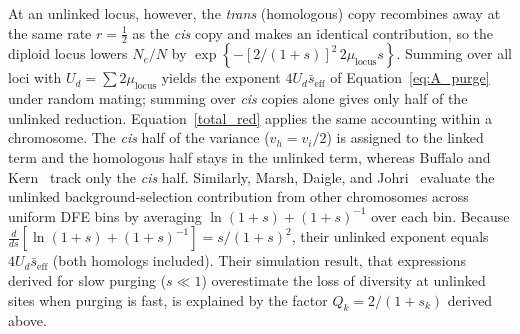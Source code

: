 \documentclass{article}
\begin{document}
At an unlinked locus, however, the \textit{trans} (homologous) copy recombines away at the same rate $r = \tfrac12$ as the \textit{cis} copy and makes an identical contribution, so the diploid locus lowers $N_e/N$ by $\exp\left\{-[2/(1+s)]^2\,2\mu_\text{locus}s\right\}$. Summing over all loci with $U_d = \sum 2\mu_\text{locus}$ yields the exponent $4U_d\bar{s}_\text{eff}$ of Equation~\eqref{eq:A_purge} under random mating; summing over \textit{cis} copies alone gives only half of the unlinked reduction. Equation~\eqref{total_red} applies the same accounting within a chromosome. The \textit{cis} half of the variance ($v_h = v_i/2$) is assigned to the linked term and the homologous half stays in the unlinked term, whereas Buffalo and Kern~\cite{buffaloKern2024} track only the \textit{cis} half. Similarly, Marsh, Daigle, and Johri~\cite[Equation~4]{marsh2026} evaluate the unlinked background-selection contribution from other chromosomes across uniform DFE bins by averaging $\ln(1 + s) + (1 + s)^{-1}$ over each bin. Because $\frac{d}{ds}\left[\ln(1 + s) + (1 + s)^{-1}\right] = s/(1 + s)^2$, their unlinked exponent equals $4U_d\bar{s}_\text{eff}$ (both homologs included). Their simulation result, that expressions derived for slow purging ($s \ll 1$) overestimate the loss of diversity at unlinked sites when purging is fast, is explained by the factor $Q_k = 2/(1 + s_k)$ derived above.

\ifdefined\isMainDocument
\else
    \printbibliography
    
\end{document}
